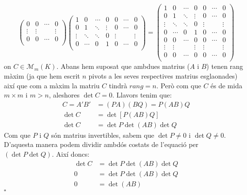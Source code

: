 \documentclass[11pt,a4paper]{article}
\newcommand*{\QED}{\hfill\ensuremath{\square}}
\begin{document}
\begin{enumerate}
$$\begin{pmatrix}
      0 & 0 & \cdots & 0 \\
      \vdots & \vdots &  & \vdots \\
      0 & 0 & \cdots & 0 \\
   \end{pmatrix}
   \begin{pmatrix}
      1 & 0 & \cdots & 0 & 0 & \cdots & 0 \\
      0 & 1 & \ddots & \vdots & 0 & \cdots & 0\\
      \vdots & \ddots & \ddots & 0 & \vdots &  & \vdots \\
      0 & \cdots & 0 & 1 & 0 & \cdots & 0\\
   \end{pmatrix}=
   \begin{pmatrix}
      1 & 0 & \cdots & 0 & 0 & \cdots & 0\\
      0 & 1 & \ddots & \vdots & 0 & \cdots & 0 \\
      \vdots & \ddots & \ddots & 0 & \vdots &  & \vdots  \\
      0 & \cdots & 0 & 1 & 0 & \cdots & 0 \\
      0 & 0 & \cdots & 0 & 0 & \cdots & 0 \\
      \vdots & \vdots &  & \vdots & \vdots &  & \vdots  \\
      0 & 0 & \cdots & 0 & 0 & \cdots & 0\\
   \end{pmatrix}$$ on $C\in \mathcal{M}_m(K)$. Abans hem suposat que ambdues matrius ($A$ i $B$) tenen rang màxim (ja que hem escrit $n$ pivots a les seves respectives matrius esglaonades) així que com a màxim la matriu $C$ tindrà $rang=n$. Però com que $C$ és de mida $m\times m$ i $m>n$, aleshores $\det C=0$. Llavors tenim que: 
   \begin{align*}
       C=A'B'&=(PA)(BQ)=P(AB)Q \\
       \det C&=\det [P(AB)Q] \\
       \det C&=\det P \det(AB) \det Q
   \end{align*}
   Com que $P$ i $Q$ són matrius invertibles, sabem que $\det P\ne 0$ i $\det Q\ne 0$. D'aquesta manera podem dividir ambdós costats de l'equació per $(\det P \det Q)$. Així doncs:
   \begin{align*}
       \det C&=\det P \det(AB) \det Q \\
       0&=\det P \det(AB) \det Q \\
       0&=\det(AB)
   \end{align*}\QED
   

\end{enumerate}
\end{document}
